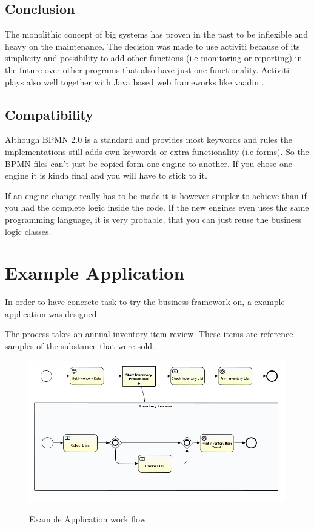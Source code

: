 \documentclass[paper=a4,twoside=false,BCOR=0mm,DIV=calc,fontsize=12pt]{scrartcl}
\begin{document}
\subsection{Conclusion}
The monolithic concept of big systems has proven in the past to be inflexible and heavy on the maintenance. 
The decision was made to use activiti because of its simplicity and possibility to add other functions (i.e monitoring or reporting) in the future over other programs that also have just one functionality.
Activiti plays also well together with Java based web frameworks like vaadin \cite{vaadin}.


\subsection{Compatibility}
Although BPMN 2.0 is a standard and provides most keywords and rules the implementations still adds own keywords or extra functionality (i.e forms). So the BPMN files can't just be copied form one engine to another. If you chose one engine it is kinda final and you will have to stick to it.

If an engine change really has to be made it is however simpler to achieve than if you had the complete logic inside the code. If the new engines even
uses the same programming language, it is very probable, that you can just reuse the business logic classes. 


\section{Example Application}
In order to have concrete task to try the business framework on, a example application was designed.

The process takes an annual inventory item review. These items are reference samples of the substance that were sold.

\begin{figure}
    \begin{center}
      \includegraphics[width=1\textwidth]{./img/PanExampleBPMN.png}\\
    \end{center}
  \caption{Example Application work flow}
  \label{panexampleWorkflow}
\end{figure} 
\end{document}

